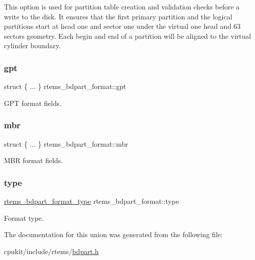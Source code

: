 This option is used for partition table creation and validation checks before a write to the disk. It ensures that the first primary partition and the logical partitions start at head one and sector one under the virtual one head and 63 sectors geometry. Each begin and end of a partition will be aligned to the virtual cylinder boundary. \mbox{\label{unionrtems__bdpart__format_ae9ba5ea27ab8373f76d113cbaeb99cb0}} 
\subsubsection{\texorpdfstring{gpt}{gpt}}
{\footnotesize\ttfamily struct \{ ... \}   rtems\+\_\+bdpart\+\_\+format\+::gpt}

G\+PT format fields. \mbox{\label{unionrtems__bdpart__format_adf975df369c624fc9167d2a3de57f370}} 
\subsubsection{\texorpdfstring{mbr}{mbr}}
{\footnotesize\ttfamily struct \{ ... \}   rtems\+\_\+bdpart\+\_\+format\+::mbr}

M\+BR format fields. \mbox{\label{unionrtems__bdpart__format_af88b7d18ad0fe9d134c6dbf03c63e1e7}} 
\subsubsection{\texorpdfstring{type}{type}}
{\footnotesize\ttfamily \mbox{\hyperlink{group__rtems__bdpart_ga688bdae263560502610c958bd45ff8af}{rtems\+\_\+bdpart\+\_\+format\+\_\+type}} rtems\+\_\+bdpart\+\_\+format\+::type}

Format type. 

The documentation for this union was generated from the following file\+:\begin{DoxyCompactItemize}
\item 
cpukit/include/rtems/\mbox{\hyperlink{bdpart_8h}{bdpart.\+h}}\end{DoxyCompactItemize}
